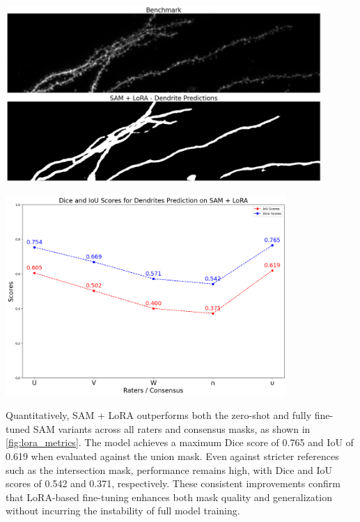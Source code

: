 \begin{center}
\includegraphics[width=0.9\textwidth]{figures/27_lora_qualitative.png}
\label{fig:lora_qualitative}
\end{center}

\begin{center}
\includegraphics[width=0.8\textwidth]{figures/28_lora_metrics.png}
\label{fig:lora_metrics}
\end{center}


Quantitatively, \gls{SAM} + \gls{LoRA} outperforms both the zero-shot and fully fine-tuned \gls{SAM} variants across all raters and consensus masks, as shown in \autoref{fig:lora_metrics}. The model achieves a maximum Dice score of 0.765 and \gls{IoU} of 0.619 when evaluated against the union mask. Even against stricter references such as the intersection mask, performance remains high, with Dice and \gls{IoU} scores of 0.542 and 0.371, respectively. These consistent improvements confirm that \gls{LoRA}-based fine-tuning enhances both mask quality and generalization without incurring the instability of full model training.

